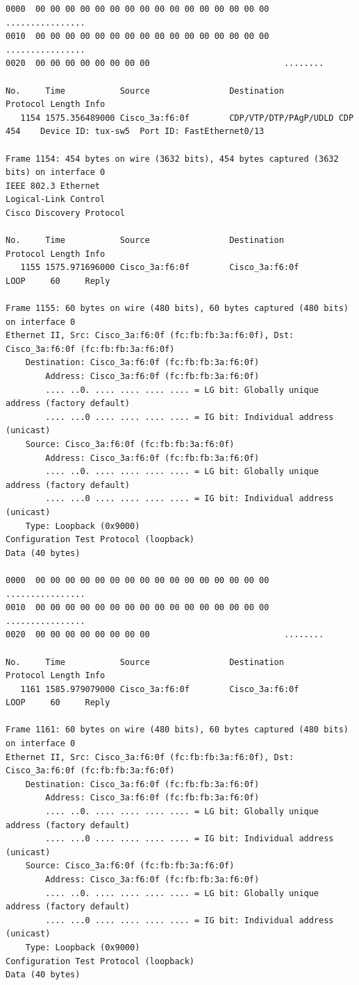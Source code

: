 \documentclass[a4paper,11pt]{article}
\begin{document}
\begin{lstlisting}
0000  00 00 00 00 00 00 00 00 00 00 00 00 00 00 00 00   ................
0010  00 00 00 00 00 00 00 00 00 00 00 00 00 00 00 00   ................
0020  00 00 00 00 00 00 00 00                           ........

No.     Time           Source                Destination           Protocol Length Info
   1154 1575.356489000 Cisco_3a:f6:0f        CDP/VTP/DTP/PAgP/UDLD CDP      454    Device ID: tux-sw5  Port ID: FastEthernet0/13  

Frame 1154: 454 bytes on wire (3632 bits), 454 bytes captured (3632 bits) on interface 0
IEEE 802.3 Ethernet 
Logical-Link Control
Cisco Discovery Protocol

No.     Time           Source                Destination           Protocol Length Info
   1155 1575.971696000 Cisco_3a:f6:0f        Cisco_3a:f6:0f        LOOP     60     Reply

Frame 1155: 60 bytes on wire (480 bits), 60 bytes captured (480 bits) on interface 0
Ethernet II, Src: Cisco_3a:f6:0f (fc:fb:fb:3a:f6:0f), Dst: Cisco_3a:f6:0f (fc:fb:fb:3a:f6:0f)
    Destination: Cisco_3a:f6:0f (fc:fb:fb:3a:f6:0f)
        Address: Cisco_3a:f6:0f (fc:fb:fb:3a:f6:0f)
        .... ..0. .... .... .... .... = LG bit: Globally unique address (factory default)
        .... ...0 .... .... .... .... = IG bit: Individual address (unicast)
    Source: Cisco_3a:f6:0f (fc:fb:fb:3a:f6:0f)
        Address: Cisco_3a:f6:0f (fc:fb:fb:3a:f6:0f)
        .... ..0. .... .... .... .... = LG bit: Globally unique address (factory default)
        .... ...0 .... .... .... .... = IG bit: Individual address (unicast)
    Type: Loopback (0x9000)
Configuration Test Protocol (loopback)
Data (40 bytes)

0000  00 00 00 00 00 00 00 00 00 00 00 00 00 00 00 00   ................
0010  00 00 00 00 00 00 00 00 00 00 00 00 00 00 00 00   ................
0020  00 00 00 00 00 00 00 00                           ........

No.     Time           Source                Destination           Protocol Length Info
   1161 1585.979079000 Cisco_3a:f6:0f        Cisco_3a:f6:0f        LOOP     60     Reply

Frame 1161: 60 bytes on wire (480 bits), 60 bytes captured (480 bits) on interface 0
Ethernet II, Src: Cisco_3a:f6:0f (fc:fb:fb:3a:f6:0f), Dst: Cisco_3a:f6:0f (fc:fb:fb:3a:f6:0f)
    Destination: Cisco_3a:f6:0f (fc:fb:fb:3a:f6:0f)
        Address: Cisco_3a:f6:0f (fc:fb:fb:3a:f6:0f)
        .... ..0. .... .... .... .... = LG bit: Globally unique address (factory default)
        .... ...0 .... .... .... .... = IG bit: Individual address (unicast)
    Source: Cisco_3a:f6:0f (fc:fb:fb:3a:f6:0f)
        Address: Cisco_3a:f6:0f (fc:fb:fb:3a:f6:0f)
        .... ..0. .... .... .... .... = LG bit: Globally unique address (factory default)
        .... ...0 .... .... .... .... = IG bit: Individual address (unicast)
    Type: Loopback (0x9000)
Configuration Test Protocol (loopback)
Data (40 bytes)


\end{lstlisting}
\end{document}
